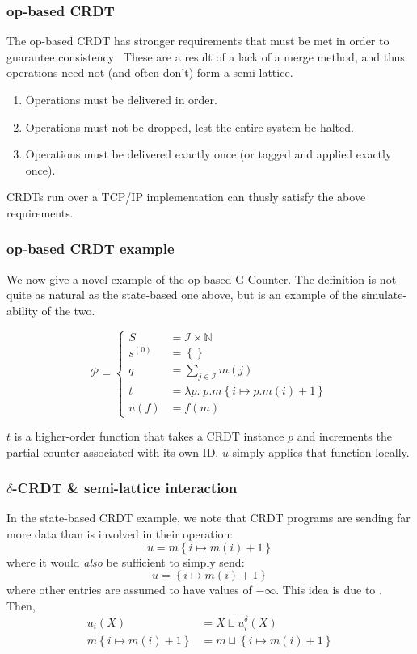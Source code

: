 \documentclass[aspectratio=169,compress]{beamer}
\begin{document}
  \begin{frame}
    \frametitle{op-based CRDT}

    The op-based CRDT has stronger requirements that must be met in order to
    guarantee consistency~\citep{shapiro11} These are a result of a lack of a
    merge method, and thus operations need not (and often don't) form a
    semi-lattice.

    \begin{enumerate}
      \item Operations must be delivered in order.
      \item Operations must not be dropped, lest the entire system be halted.
      \item Operations must be delivered exactly once (or tagged and applied
        exactly once).
    \end{enumerate}

    CRDTs run over a TCP/IP implementation can thusly satisfy the above
    requirements.
  \end{frame}

  \begin{frame}
    \frametitle{op-based CRDT example}

    We now give a novel example of the op-based G-Counter. The definition is not
    quite as natural as the state-based one above, but is an example of the
    simulate-ability of the two.

    \[
      \mathcal{P} = \left\{\begin{aligned}
        S &= \mathcal{I} \times \mathbb{N} \\
        s^{(0)} &= \left\{ \right\} \\
        q &= \sum_{j \in \mathcal{I}} m(j) \\
        t &= \lambda p.\; p.m\left\{i \mapsto p.m(i) + 1 \right\} \\
        u(f) &= f(m)
      \end{aligned}\right.
    \]

    $t$ is a higher-order function that takes a CRDT instance $p$ and increments
    the partial-counter associated with its own ID. $u$ simply applies that
    function locally.
  \end{frame}

  \begin{frame}
    \frametitle{$\delta$-CRDT \& semi-lattice interaction}

    In the state-based CRDT example, we note that CRDT programs are sending far
    more data than is involved in their operation:
    \[
      u = m\left\{ i \mapsto m(i) + 1 \right\}
    \]
    where it would \textit{also} be sufficient to simply send:
    \[
      u = \left\{ i \mapsto m(i) + 1 \right\}
    \]
    where other entries are assumed to have values of $-\infty$. This idea is
    due to \cite{almeida16}. Then,
    \[
      \begin{aligned}
        u_i(X) &= X \sqcup u_i^\delta(X) \\
        m\left\{ i \mapsto m(i) + 1 \right\} &= m \sqcup \left\{ i \mapsto m(i) + 1 \right\}
      \end{aligned}
    \]
  \end{frame}
\end{document}
